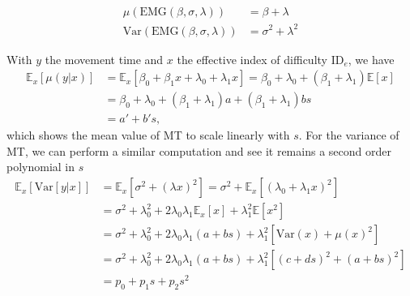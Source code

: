 \documentclass[12pt,a4paper]{article}
\newcommand{\ide}{\ensuremath{{\text{ID}_e}}\xspace}
\begin{document}
\begin{align}
	\mu(\text{EMG}(\beta, \sigma, \lambda))        & =  \beta + \lambda     \\
	\text{Var}(\text{EMG}(\beta, \sigma, \lambda)) & = \sigma^2 + \lambda^2
\end{align}

With $y$ the movement time and $x$ the effective index of difficulty \ide, we have
\begin{align}
	\mathbb{E}_x[\mu(y|x)] & = \mathbb{E}_x[\beta_0 + \beta_1 x + \lambda_0 + \lambda_1 x] = \beta_0 + \lambda_0 + (\beta_1 + \lambda_1)\mathbb{E}[x] \\
	                       & = \beta_0 + \lambda_0 + (\beta_1 + \lambda_1)a + (\beta_1 + \lambda_1)bs                                                 \\
	                       & = a' + b' s,
\end{align}
which shows the mean value of MT to scale linearly with $s$. For the variance of MT, we can perform a similar computation and see it remains a second order polynomial in $s$
\begin{align}
	\mathbb{E}_x[\text{Var}[y|x]] & = \mathbb{E}_x[\sigma^2 + (\lambda x)^2] = \sigma^2 + \mathbb{E}_x[(\lambda_0 + \lambda_1 x)^2]                \\
	                              & = \sigma^2 + \lambda_0^2 + 2\lambda_0 \lambda_1 \mathbb{E}_x[x] + \lambda_1^2 \mathbb{E}[x^2]                  \\
	                              & = \sigma^2 + \lambda_0^2 + 2\lambda_0\lambda_1 (a + b s) + \lambda_1^2 \left[ \text{Var}(x) + \mu(x)^2 \right] \\
	                              & = \sigma^2 + \lambda_0^2 + 2\lambda_0 \lambda_1(a + bs) + \lambda_1^2 \left[(c + ds)^2 + (a+bs)^2\right]       \\
	                              & = p_0 + p_1s + p_2s^2
\end{align}





\end{document}
